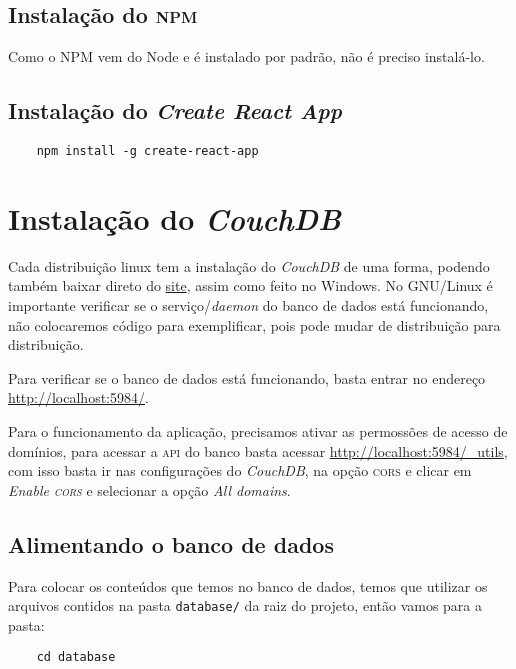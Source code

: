 \subsection{Instalação do \textsc{npm}}
Como o NPM vem do Node e é instalado por padrão, não é preciso instalá-lo.

\subsection{Instalação do \emph{Create React App}}
\begin{verbatim}
	npm install -g create-react-app
\end{verbatim}

\section{Instalação do \emph{CouchDB}}
Cada distribuição linux tem a instalação do \emph{CouchDB} de uma forma, podendo também baixar direto do \href{https://couchdb.apache.org}{site}, assim como feito no Windows. No GNU/Linux é importante verificar se o serviço/\emph{daemon} do banco de dados está funcionando, não colocaremos código para exemplificar, pois pode mudar de distribuição para distribuição.

Para verificar se o banco de dados está funcionando, basta entrar no endereço \href{http://localhost:5984/}{http://localhost:5984/}.

Para o funcionamento da aplicação, precisamos ativar as permossões de acesso de domínios, para acessar a \textsc{api} do banco basta acessar \href{http://localhost:5984/\_utils}{http://localhost:5984/\_utils}, com isso basta ir nas configurações do \emph{CouchDB}, na opção \textsc{cors} e clicar em \emph{Enable \textsc{cors}} e selecionar a opção \emph{All domains}.

\subsection{Alimentando o banco de dados}
Para colocar os conteúdos que temos no banco de dados, temos que utilizar os arquivos contidos na pasta \texttt{database/} da raiz do projeto, então vamos para a pasta:

\begin{verbatim}
	cd database
\end{verbatim}

